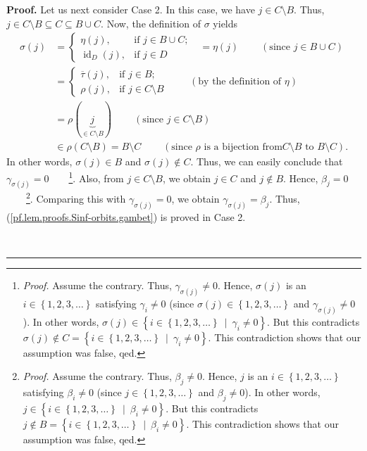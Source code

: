 \documentclass[numbers=enddot,12pt,final,onecolumn,notitlepage]{scrartcl}%
\theoremstyle{definition}
\newenvironment{proof}[1][Proof]{\noindent\textbf{#1.} }{\ \rule{0.5em}{0.5em}}
\newenvironment{verlong}{}{}
\begin{document}
\begin{verlong}
\begin{proof}
Let us next consider Case 2. In this case, we have $j\in C\setminus B$. Thus,
$j\in C\setminus B\subseteq C\subseteq B\cup C$. Now, the definition of
$\sigma$ yields
\begin{align*}
\sigma\left(  j\right)   &  =%
\begin{cases}
\eta\left(  j\right)  , & \text{if }j\in B\cup C;\\
\operatorname*{id}\nolimits_{D}\left(  j\right)  , & \text{if }j\in D
\end{cases}
\ \ \ =\eta\left(  j\right)  \ \ \ \ \ \ \ \ \ \ \left(  \text{since }j\in
B\cup C\right) \\
&  =%
\begin{cases}
\overline{\tau}\left(  j\right)  , & \text{if }j\in B;\\
\rho\left(  j\right)  , & \text{if }j\in C\setminus B
\end{cases}
\ \ \ \ \ \ \ \ \ \ \left(  \text{by the definition of }\eta\right) \\
&  =\rho\left(  \underbrace{j}_{\in C\setminus B}\right)
\ \ \ \ \ \ \ \ \ \ \left(  \text{since }j\in C\setminus B\right) \\
&  \in\rho\left(  C\setminus B\right)  =B\setminus
C\ \ \ \ \ \ \ \ \ \ \left(  \text{since }\rho\text{ is a bijection from
}C\setminus B\text{ to }B\setminus C\right)  .
\end{align*}
In other words, $\sigma\left(  j\right)  \in B$ and $\sigma\left(  j\right)
\notin C$. Thus, we can easily conclude that $\gamma_{\sigma\left(  j\right)
}=0$\ \ \ \ \footnote{\textit{Proof.} Assume the contrary. Thus,
$\gamma_{\sigma\left(  j\right)  }\neq0$. Hence, $\sigma\left(  j\right)  $ is
an $i\in\left\{  1,2,3,\ldots\right\}  $ satisfying $\gamma_{i}\neq0$ (since
$\sigma\left(  j\right)  \in\left\{  1,2,3,\ldots\right\}  $ and
$\gamma_{\sigma\left(  j\right)  }\neq0$). In other words, $\sigma\left(
j\right)  \in\left\{  i\in\left\{  1,2,3,\ldots\right\}  \ \mid\ \gamma
_{i}\neq0\right\}  $. But this contradicts $\sigma\left(  j\right)  \notin
C=\left\{  i\in\left\{  1,2,3,\ldots\right\}  \ \mid\ \gamma_{i}\neq0\right\}
$. This contradiction shows that our assumption was false, qed.}. Also, from
$j\in C\setminus B$, we obtain $j\in C$ and $j\notin B$. Hence, $\beta_{j}%
=0$\ \ \ \ \footnote{\textit{Proof.} Assume the contrary. Thus, $\beta_{j}%
\neq0$. Hence, $j$ is an $i\in\left\{  1,2,3,\ldots\right\}  $ satisfying
$\beta_{i}\neq0$ (since $j\in\left\{  1,2,3,\ldots\right\}  $ and $\beta
_{j}\neq0$). In other words, $j\in\left\{  i\in\left\{  1,2,3,\ldots\right\}
\ \mid\ \beta_{i}\neq0\right\}  $. But this contradicts $j\notin B=\left\{
i\in\left\{  1,2,3,\ldots\right\}  \ \mid\ \beta_{i}\neq0\right\}  $. This
contradiction shows that our assumption was false, qed.}. Comparing this with
$\gamma_{\sigma\left(  j\right)  }=0$, we obtain $\gamma_{\sigma\left(
j\right)  }=\beta_{j}$. Thus, (\ref{pf.lem.proofs.Sinf-orbits.gambet}) is
proved in Case 2.


\end{proof}
\end{verlong}
\end{document}
